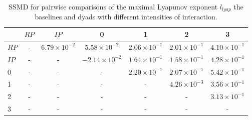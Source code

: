 \begin{table}
\centering
\caption{SSMD for pairwise comparisons of the maximal Lyapunov exponent $l_{lyap}$ the baselines and dyads with different intensities of interaction.}
\label{tab:ssmd_lyapunov}
\begin{tabular}{lcccccc}
\toprule
 & $RP$ & $IP$ & 0 & 1 & 2 & 3 \\
\midrule
$RP$ & - & $6.79 \times 10^{-2}$ & $5.58 \times 10^{-2}$ & $2.06 \times 10^{-1}$ & $2.01 \times 10^{-1}$ & $4.10 \times 10^{-1}$ \\
$IP$ & - & - & $-2.14 \times 10^{-2}$ & $1.64 \times 10^{-1}$ & $1.58 \times 10^{-1}$ & $4.28 \times 10^{-1}$ \\
0 & - & - & - & $2.20 \times 10^{-1}$ & $2.07 \times 10^{-1}$ & $5.42 \times 10^{-1}$ \\
1 & - & - & - & - & $4.26 \times 10^{-3}$ & $3.56 \times 10^{-1}$ \\
2 & - & - & - & - & - & $3.13 \times 10^{-1}$ \\
3 & - & - & - & - & - & - \\
\bottomrule
\end{tabular}
\end{table}
